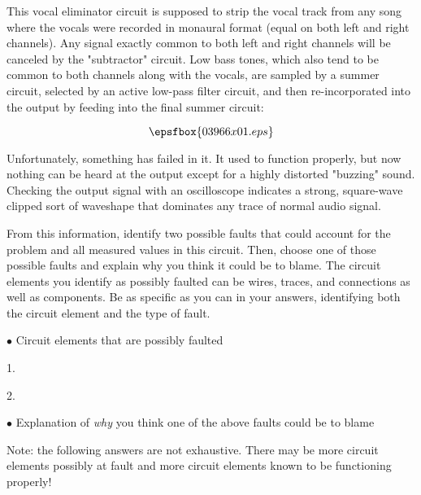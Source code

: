 

This vocal eliminator circuit is supposed to strip the vocal track from any song where the vocals were recorded in monaural format (equal on both left and right channels).  Any signal exactly common to both left and right channels will be canceled by the "subtractor" circuit.  Low bass tones, which also tend to be common to both channels along with the vocals, are sampled by a summer circuit, selected by an active low-pass filter circuit, and then re-incorporated into the output by feeding into the final summer circuit:

$$\epsfbox{03966x01.eps}$$

Unfortunately, something has failed in it.  It used to function properly, but now nothing can be heard at the output except for a highly distorted "buzzing" sound.  Checking the output signal with an oscilloscope indicates a strong, square-wave clipped sort of waveshape that dominates any trace of normal audio signal. 

From this information, identify two possible faults that could account for the problem and all measured values in this circuit.  Then, choose one of those possible faults and explain why you think it could be to blame.  The circuit elements you identify as possibly faulted can be wires, traces, and connections as well as components.  Be as specific as you can in your answers, identifying both the circuit element and the type of fault.

\medskip
\goodbreak
\item{$\bullet$} Circuit elements that are possibly faulted
\item{1.}
\item{2.} 
\medskip

\medskip
\goodbreak
\item{$\bullet$} Explanation of {\it why} you think one of the above faults could be to blame

\vskip 30pt







Note: the following answers are not exhaustive.  There may be more circuit elements possibly at fault and more circuit elements known to be functioning properly!

